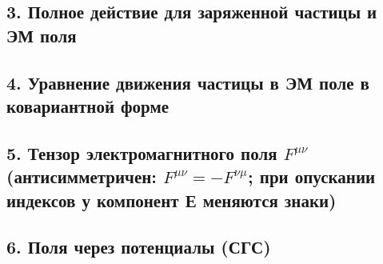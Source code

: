 \documentclass[10pt]{article}
\begin{document}
\subsection*{3. Полное действие для заряженной частицы и ЭМ поля}
\subsection*{4. Уравнение движения частицы в ЭМ поле в ковариантной форме}
\subsection*{5. Тензор электромагнитного поля $F^{\mu\nu}$ (антисимметричен: $F^{\mu\nu} = -F^{\nu\mu}$; при опускании индексов у компонент Е меняются знаки)}
\subsection*{6. Поля через потенциалы (СГС)}
\end{document}
